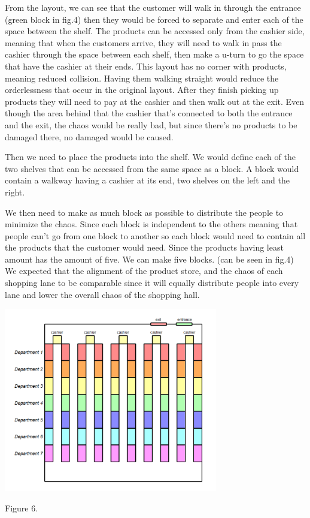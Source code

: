 \par From the layout, we can see that the customer will walk in through the entrance (green block in fig.4) then they would be forced to separate and enter each of the space between the shelf. The products can be accessed only from the cashier side, meaning that when the customers arrive, they will need to walk in pass the cashier through the space between each shelf, then make a u-turn to go the space that have the cashier at their ends. This layout has no corner with products, meaning reduced collision. Having them walking straight would reduce the orderlessness that occur in the original layout. After they finish picking up products they will need to pay at the cashier and then walk out at the exit. Even though the area behind that the cashier that's connected to both the entrance and the exit, the chaos would be really bad, but since there's no products to be damaged there, no damaged would be caused.
\newline

\par Then we need to place the products into the shelf. We would define each of the two shelves that can be accessed from the same space as a block. A block would contain a walkway having a cashier at its end, two shelves on the left and the right. 
\newline

\par We then need to make as much block as possible to distribute the people to minimize the chaos. Since each block is independent to the others meaning that people can't go from one block to another so each block would need to contain all the products that the customer would need. Since the products having least amount has the amount of five. We can make five blocks. (can be seen in fig.4) We expected that the alignment of the product store, and the chaos of each shopping lane to be comparable since it will equally distribute people into every lane and lower the overall chaos of the shopping hall.
\newline

\begin{center}
\includegraphics[width=0.7\textwidth]{fig4.2.PNG} 
\end{center}
\begin{center}
Figure 6.
\end{center}

